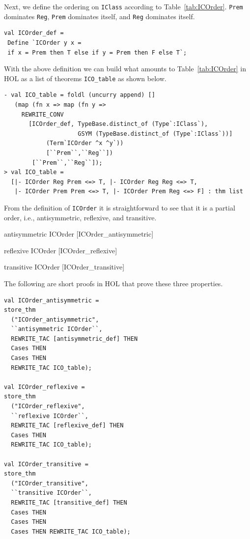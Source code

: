 Next, we define the ordering on \texttt{IClass} according to
Table~\ref{tab:ICOrder}. \texttt{Prem} dominates \texttt{Reg},
\texttt{Prem} dominates itself, and \texttt{Reg} dominates itself.
\begin{session}
\begin{verbatim}
val ICOrder_def = 
 Define `ICOrder y x = 
 if x = Prem then T else if y = Prem then F else T`;
\end{verbatim}
\end{session}

With the above definition we can build what amounts to Table~\ref{tab:ICOrder} in HOL as a list of theorems \texttt{ICO_table} as shown below.
\begin{session}
\begin{verbatim}
- val ICO_table = foldl (uncurry append) []
   (map (fn x => map (fn y =>
     REWRITE_CONV 
       [ICOrder_def, TypeBase.distinct_of (Type`:IClass`),
                     GSYM (TypeBase.distinct_of (Type`:IClass`))]
            (Term`ICOrder ^x ^y`))
            [``Prem``,``Reg``])
	    [``Prem``,``Reg``]);
> val ICO_table =
  [|- ICOrder Reg Prem <=> T, |- ICOrder Reg Reg <=> T,
   |- ICOrder Prem Prem <=> T, |- ICOrder Prem Reg <=> F] : thm list
\end{verbatim}
\end{session}

From the definition of \texttt{ICOrder} it is straightforward to see that it is a partial order, i.e., antisymmetric, reflexive, and transitive.

\HOLTokenTurnstile{} antisymmetric ICOrder \hfill{[ICOrder_antisymmetric]}

\HOLTokenTurnstile{} reflexive ICOrder \hfill{[ICOrder_reflexive]}

\HOLTokenTurnstile{} transitive ICOrder \hfill{[ICOrder_transitive]}

The following are short proofs in HOL that prove these three
properties.

\begin{session}
\begin{verbatim}
val ICOrder_antisymmetric =
store_thm
  ("ICOrder_antisymmetric",
  ``antisymmetric ICOrder``,
  REWRITE_TAC [antisymmetric_def] THEN
  Cases THEN
  Cases THEN
  REWRITE_TAC ICO_table);

val ICOrder_reflexive =
store_thm
  ("ICOrder_reflexive",
  ``reflexive ICOrder``,
  REWRITE_TAC [reflexive_def] THEN
  Cases THEN
  REWRITE_TAC ICO_table);

val ICOrder_transitive =
store_thm
  ("ICOrder_transitive",
  ``transitive ICOrder``,
  REWRITE_TAC [transitive_def] THEN
  Cases THEN
  Cases THEN
  Cases THEN REWRITE_TAC ICO_table);
\end{verbatim}
\end{session}

